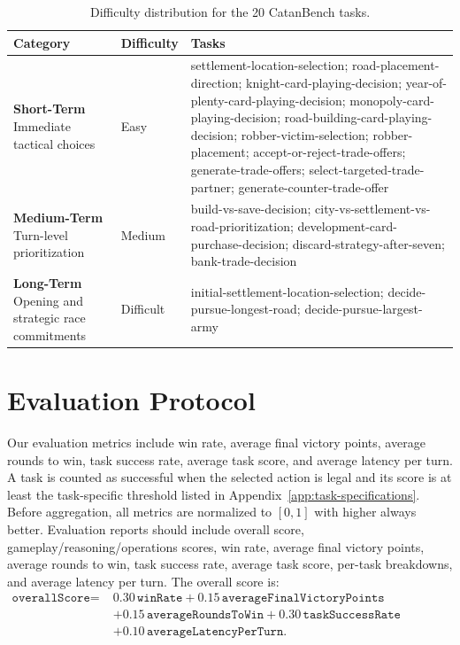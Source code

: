 \documentclass{article}
\begin{document}
\begin{table}[H]
\centering
\scriptsize
\setlength{\tabcolsep}{3pt}
\begin{tabular}{|p{}|p{}|p{}|}
\hline
\textbf{Category} & \textbf{Difficulty} & \textbf{Tasks} \\
\hline
\textbf{Short-Term} \newline Immediate tactical choices
& Easy
& \raggedright settlement-location-selection; road-placement-direction; knight-card-playing-decision; year-of-plenty-card-playing-decision; monopoly-card-playing-decision; road-building-card-playing-decision; robber-victim-selection; robber-placement; accept-or-reject-trade-offers; generate-trade-offers; select-targeted-trade-partner; generate-counter-trade-offer
 \tabularnewline
\hline
\textbf{Medium-Term} \newline Turn-level prioritization
& Medium
& \raggedright build-vs-save-decision; city-vs-settlement-vs-road-prioritization; development-card-purchase-decision; discard-strategy-after-seven; bank-trade-decision
\tabularnewline
\hline
\textbf{Long-Term} \newline Opening and strategic race commitments
& Difficult
& \raggedright initial-settlement-location-selection; decide-pursue-longest-road; decide-pursue-largest-army
\tabularnewline
\hline
\end{tabular}
\caption{Difficulty distribution for the 20 CatanBench tasks.}
\label{tab:difficulty-distribution}
\end{table}

\section{Evaluation Protocol}
\label{sec:evaluation}
Our evaluation metrics include win rate, average final victory points, average rounds to win, task success rate, average task score, and average latency per turn.  A task is counted as successful when the selected action is legal and its score is at least the task-specific threshold listed in Appendix~\ref{app:task-specifications}.
Before aggregation, all metrics are normalized to $[0,1]$ with higher always better. Evaluation reports should include overall score, gameplay/reasoning/operations scores, win rate, average final victory points, average rounds to win, task success rate, average task score, per-task breakdowns, and average latency per turn. The overall score is: $
\begin{aligned}
\texttt{overallScore} =\;&
0.30\,\texttt{winRate}
+ 0.15\,\texttt{averageFinalVictoryPoints} \\
&+ 0.15\,\texttt{averageRoundsToWin} 
+ 0.30\,\texttt{taskSuccessRate} \\
&+ 0.10\,\texttt{averageLatencyPerTurn}.
\end{aligned}
$
\end{document}
